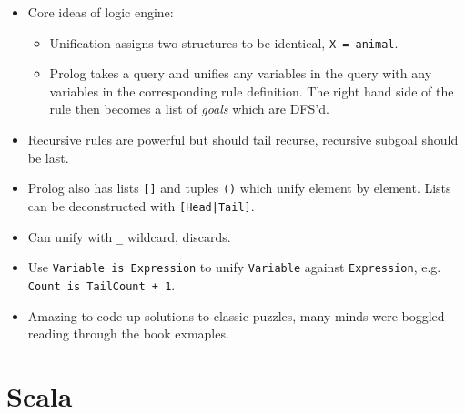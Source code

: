 \documentclass[10pt]{article}
\begin{document}
\begin{itemize}
{        values} rather than just \lstinline{yes/no} above, e.g.\
        \lstinline{likes(Who, java)}.
        \begin{itemize}
            \item Seems like responses are pagined, with \lstinline{;} to
                advance and \lstinline{a} to get all of them.
        \end{itemize}
    \item Core ideas of logic engine:
        \begin{itemize}
            \item Unification assigns two structures to be identical,
                \lstinline{X = animal}.
            \item Prolog takes a query and unifies any variables in the query
                with any variables in the corresponding rule definition. The
                right hand side of the rule then becomes a list of
                \emph{goals} which are DFS'd.
        \end{itemize}
    \item Recursive rules are powerful but should tail recurse, recursive
        subgoal should be last.
    \item Prolog also has lists \lstinline{[]} and tuples \lstinline{()} which
        unify element by element. Lists can be deconstructed with
        \lstinline{[Head|Tail]}.
    \item Can unify with \lstinline{_} wildcard, discards.
    \item Use \lstinline{Variable is Expression} to unify \lstinline{Variable}
        against \lstinline{Expression}, e.g.
        \lstinline{Count is TailCount + 1}.
    \item Amazing to code up solutions to classic puzzles, many minds were
        boggled reading through the book exmaples.
\end{itemize}

\section{Scala}
\end{document}
